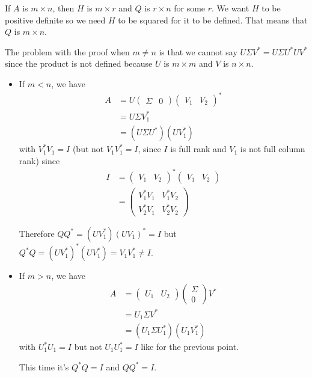 \begin{solution}
  If $A$ is $m \times n$, then $H$ is $m \times r$ and $Q$ is $r \times n$ for some $r$.
  We want $H$ to be positive definite so we need $H$ to be squared for it to be defined.
  That means that $Q$ is $m \times n$.

  The problem with the proof when $m \neq n$ is that we cannot say
  $U \Sigma V^* = U \Sigma U^* U V^*$ since the product is not defined because $U$ is $m \times m$
  and $V$ is $n \times n$.
  \begin{itemize}
    \item If $m < n$, we have
      \begin{align*}
        A
        & = U
        \begin{pmatrix}
          \Sigma & 0
        \end{pmatrix}
        \begin{pmatrix}
          V_1 & V_2
        \end{pmatrix}^*\\
        & = U \Sigma V_1^*\\
        & = (U \Sigma U^*) (U V_1^*)
      \end{align*}
      with $V_1^*V_1 = I$ (but not $V_1V_1^* = I$, since $I$ is full rank and $V_1$ is not full column rank)
      since
      \begin{align*}
        I
        & =
        \begin{pmatrix}
          V_1 & V_2
        \end{pmatrix}^*
        \begin{pmatrix}
          V_1 & V_2
        \end{pmatrix}\\
        & =
        \begin{pmatrix}
          V_1^*V_1 & V_1^*V_2\\
          V_2^*V_1 & V_2^*V_2
        \end{pmatrix}
      \end{align*}

      Therefore $QQ^* = (U V_1^*) (U V_1)^* = I$ but $Q^*Q = (U V_1^*)^* (U V_1^*) = V_1V_1^* \neq I$.
    \item If $m > n$, we have
      \begin{align*}
        A
        & =
        \begin{pmatrix}
          U_1 & U_2
        \end{pmatrix}
        \begin{pmatrix}
          \Sigma \\ 0
        \end{pmatrix}
        V^*\\
        & = U_1 \Sigma V^*\\
        & = (U_1 \Sigma U_1^*) (U_1 V_1^*)
      \end{align*}
      with $U_1^*U_1 = I$ but not $U_1U_1^* = I$ like for the previous point.

      This time it's $Q^*Q = I$ and $QQ^* = I$.
  \end{itemize}
\end{solution}

